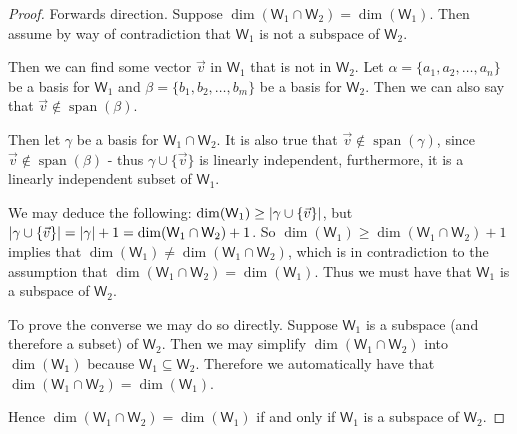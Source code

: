 \documentclass[11pt]{article}
\newcommand{\br}[1]{\left(#1\right)}
\newcommand{\cbr}[1]{\{#1\}}
\DeclareMathOperator{\Span}{span}
\begin{document}
\begin{proof}
    Forwards direction. Suppose $\dim(\mathsf{W}_1\cap\mathsf{W}_2) = \dim(\mathsf{W}_1)$. Then assume by way of contradiction that $\mathsf{W}_1$ is not a subspace of $\mathsf{W}_2$.

    Then we can find some vector $\vec{v}$ in $\mathsf{W}_1$ that is not in $\mathsf{W}_2$. Let $\alpha = \cbr{a_1,a_2,\dots,a_n}$ be a basis for $\mathsf{W}_1$ and $\beta = \cbr{b_1,b_2,\dots,b_m}$ be a basis for $\mathsf{W}_2$. Then we can also say that $\vec{v}\notin \Span\br{\beta}$.

    Then let $\gamma$ be a basis for $\mathsf{W}_1\cap\mathsf{W}_2$. It is also true that $\vec{v}\notin \Span\br{\gamma}$, since $\vec{v}\notin \Span\br{\beta}$ - thus $\gamma \cup \cbr{\vec{v}}$ is linearly independent, furthermore, it is a linearly independent subset of $\mathsf{W}_1$. 
    
    We may deduce the following: $\dim(\mathsf{W}_1)\geq \abs{\gamma \cup\cbr{\vec{v}}}$, but $\abs{\gamma \cup\cbr{\vec{v}}} = \abs{\gamma} + 1 = \dim(\mathsf{W}_1\cap\mathsf{W}_2) + 1$. So $\dim(\mathsf{W}_1)\geq \dim(\mathsf{W}_1\cap\mathsf{W}_2) + 1$ implies that $\dim(\mathsf{W}_1)\neq \dim(\mathsf{W}_1\cap\mathsf{W}_2)$, which is in contradiction to the assumption that $\dim(\mathsf{W}_1\cap\mathsf{W}_2) = \dim(\mathsf{W}_1)$. Thus we must have that $\mathsf{W}_1$ is a subspace of $\mathsf{W}_2$.

    To prove the converse we may do so directly. Suppose $\mathsf{W}_1$ is a subspace (and therefore a subset) of $\mathsf{W}_2$. Then we may simplify $\dim(\mathsf{W}_1\cap\mathsf{W}_2)$ into $\dim(\mathsf{W_1})$ because $\mathsf{W}_1\subseteq \mathsf{W}_2$. Therefore we automatically have that $\dim(\mathsf{W}_1\cap\mathsf{W}_2) = \dim(\mathsf{W}_1)$.

    Hence $\dim(\mathsf{W}_1\cap\mathsf{W}_2) = \dim(\mathsf{W}_1)$ if and only if $\mathsf{W}_1$ is a subspace of $\mathsf{W}_2$.
\end{proof}
\end{document}
